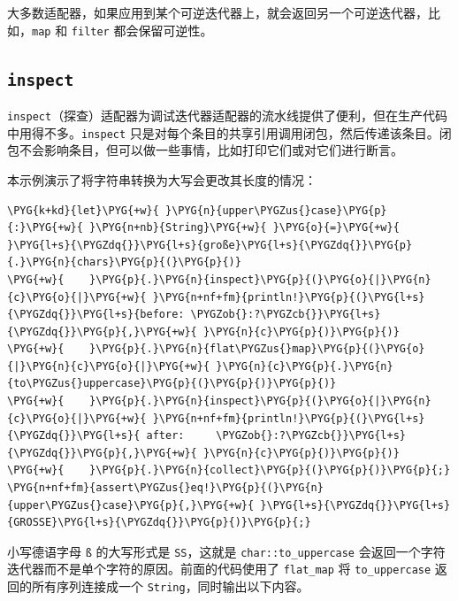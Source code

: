 大多数适配器，如果应用到某个可逆迭代器上，就会返回另一个可逆迭代器，比如，\texttt{map} 和 \texttt{filter} 都会保留可逆性。

\subsection{\texttt{inspect}}

\texttt{inspect}（探查）适配器为调试迭代器适配器的流水线提供了便利，但在生产代码中用得不多。\texttt{inspect} 只是对每个条目的共享引用调用闭包，然后传递该条目。闭包不会影响条目，但可以做一些事情，比如打印它们或对它们进行断言。

本示例演示了将字符串转换为大写会更改其长度的情况：

\begin{Verbatim}[commandchars=\\\{\},breaklines=true,breakanywhere=true,fontsize=\codefont,xleftmargin=17bp]
\PYG{k+kd}{let}\PYG{+w}{ }\PYG{n}{upper\PYGZus{}case}\PYG{p}{:}\PYG{+w}{ }\PYG{n+nb}{String}\PYG{+w}{ }\PYG{o}{=}\PYG{+w}{ }\PYG{l+s}{\PYGZdq{}}\PYG{l+s}{große}\PYG{l+s}{\PYGZdq{}}\PYG{p}{.}\PYG{n}{chars}\PYG{p}{(}\PYG{p}{)}
\PYG{+w}{    }\PYG{p}{.}\PYG{n}{inspect}\PYG{p}{(}\PYG{o}{|}\PYG{n}{c}\PYG{o}{|}\PYG{+w}{ }\PYG{n+nf+fm}{println!}\PYG{p}{(}\PYG{l+s}{\PYGZdq{}}\PYG{l+s}{before: \PYGZob{}:?\PYGZcb{}}\PYG{l+s}{\PYGZdq{}}\PYG{p}{,}\PYG{+w}{ }\PYG{n}{c}\PYG{p}{)}\PYG{p}{)}
\PYG{+w}{    }\PYG{p}{.}\PYG{n}{flat\PYGZus{}map}\PYG{p}{(}\PYG{o}{|}\PYG{n}{c}\PYG{o}{|}\PYG{+w}{ }\PYG{n}{c}\PYG{p}{.}\PYG{n}{to\PYGZus{}uppercase}\PYG{p}{(}\PYG{p}{)}\PYG{p}{)}
\PYG{+w}{    }\PYG{p}{.}\PYG{n}{inspect}\PYG{p}{(}\PYG{o}{|}\PYG{n}{c}\PYG{o}{|}\PYG{+w}{ }\PYG{n+nf+fm}{println!}\PYG{p}{(}\PYG{l+s}{\PYGZdq{}}\PYG{l+s}{ after:     \PYGZob{}:?\PYGZcb{}}\PYG{l+s}{\PYGZdq{}}\PYG{p}{,}\PYG{+w}{ }\PYG{n}{c}\PYG{p}{)}\PYG{p}{)}
\PYG{+w}{    }\PYG{p}{.}\PYG{n}{collect}\PYG{p}{(}\PYG{p}{)}\PYG{p}{;}
\PYG{n+nf+fm}{assert\PYGZus{}eq!}\PYG{p}{(}\PYG{n}{upper\PYGZus{}case}\PYG{p}{,}\PYG{+w}{ }\PYG{l+s}{\PYGZdq{}}\PYG{l+s}{GROSSE}\PYG{l+s}{\PYGZdq{}}\PYG{p}{)}\PYG{p}{;}
\end{Verbatim}

小写德语字母 \texttt{ß} 的大写形式是 \texttt{SS}，这就是 \texttt{char::to\_uppercase} 会返回一个字符迭代器而不是单个字符的原因。前面的代码使用了 \texttt{flat\_map} 将 \texttt{to\_uppercase} 返回的所有序列连接成一个 \texttt{String}，同时输出以下内容。

